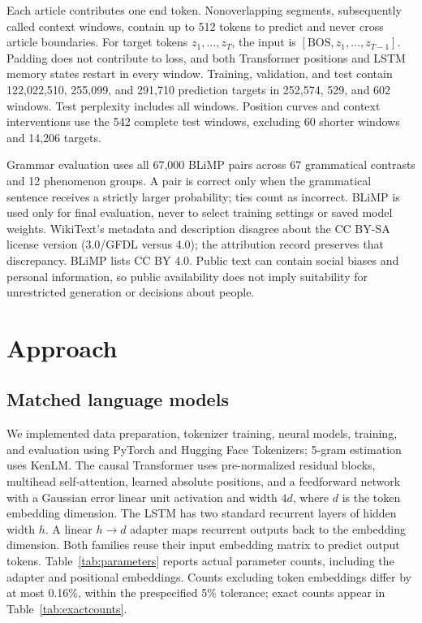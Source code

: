 \documentclass[10pt]{article}
\begin{document}
Each article contributes one end token. Nonoverlapping segments, subsequently called context windows, contain up to 512 tokens to predict and never cross article boundaries. For target tokens $z_1,\ldots,z_T$, the input is $[\mathrm{BOS},z_1,\ldots,z_{T-1}]$. Padding does not contribute to loss, and both Transformer positions and LSTM memory states restart in every window. Training, validation, and test contain 122,022,510, 255,099, and 291,710 prediction targets in 252,574, 529, and 602 windows. Test perplexity includes all windows. Position curves and context interventions use the 542 complete test windows, excluding 60 shorter windows and 14,206 targets.

Grammar evaluation uses all 67,000 BLiMP pairs across 67 grammatical contrasts and 12 phenomenon groups. A pair is correct only when the grammatical sentence receives a strictly larger probability; ties count as incorrect. BLiMP is used only for final evaluation, never to select training settings or saved model weights. WikiText's metadata and description disagree about the CC BY-SA license version (3.0/GFDL versus 4.0); the attribution record preserves that discrepancy. BLiMP lists CC BY 4.0. Public text can contain social biases and personal information, so public availability does not imply suitability for unrestricted generation or decisions about people.

\section{Approach}

\subsection{Matched language models}

We implemented data preparation, tokenizer training, neural models, training, and evaluation using PyTorch and Hugging Face Tokenizers; 5-gram estimation uses KenLM. The causal Transformer uses pre-normalized residual blocks, multihead self-attention, learned absolute positions, and a feedforward network with a Gaussian error linear unit activation and width $4d$, where $d$ is the token embedding dimension. The LSTM has two standard recurrent layers of hidden width $h$. A linear $h\!\rightarrow\!d$ adapter maps recurrent outputs back to the embedding dimension. Both families reuse their input embedding matrix to predict output tokens. Table~\ref{tab:parameters} reports actual parameter counts, including the adapter and positional embeddings. Counts excluding token embeddings differ by at most 0.16\%, within the prespecified 5\% tolerance; exact counts appear in Table~\ref{tab:exactcounts}.
\end{document}
